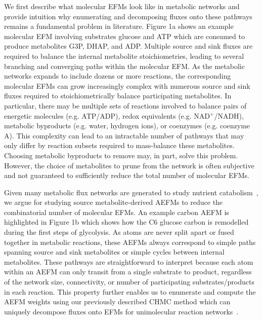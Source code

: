 \documentclass[12pt]{article}
\begin{document}
We first describe what molecular EFMs look like in metabolic networks and
provide intuition why enumerating and decomposing fluxes onto these
pathways remains a fundamental problem in literature. Figure 1a shows an
example molecular EFM involving substrates glucose and ATP which are
consumed to produce metabolites G3P, DHAP, and ADP. Multiple source and
sink fluxes are required to balance the internal metabolite
stoichiometries, leading to several branching and converging paths within
the molecular EFM. As the metabolic networks expands to include dozens or
more reactions, the corresponding molecular EFMs can grow increasingly
complex with numerous source and sink fluxes required to
stoichiometrically balance participating metabolites. In particular, there
may be multiple sets of reactions involved to balance pairs of energetic
molecules (e.g. ATP/ADP), redox equivalents (e.g. NAD$^+$/NADH), metabolic
byproducts (e.g. water, hydrogen ions), or coenzymes (e.g. coenzyme A).
This complexity can lead to an intractable number of pathways that may
only differ by reaction subsets required to mass-balance these
metabolites. Choosing metabolic byproducts to remove may, in part, solve
this problem. However, the choice of metabolites to prune from the network
is often subjective and not guaranteed to sufficiently reduce the total
number of molecular EFMs.

Given many metabolic flux networks are generated to study nutrient
catabolism~\citep{ZamboniNicola2015DtMS}, we argue for studying source
metabolite-derived AEFMs to reduce the combinatorial number of molecular
EFMs. An example carbon AEFM is highlighted in Figure 1b which shows how
the C6 glucose carbon is remodelled during the first steps of glycolysis.
As atoms are never split apart or fused together in metabolic reactions,
these AEFMs always correspond to simple paths spanning source and sink
metabolites or simple cycles between internal metabolites. These pathways
are straightforward to interpret because each atom within an AEFM can only
transit from a single substrate to product, regardless of the network
size, connectivity, or number of participating substrates/products in each
reaction. This property further enables us to enumerate and compute the
AEFM weights using our previously described CHMC method which can uniquely
decompose fluxes onto EFMs for unimolecular reaction
networks~\citep{ChitpinJustinG2023AMct}.
\end{document}
